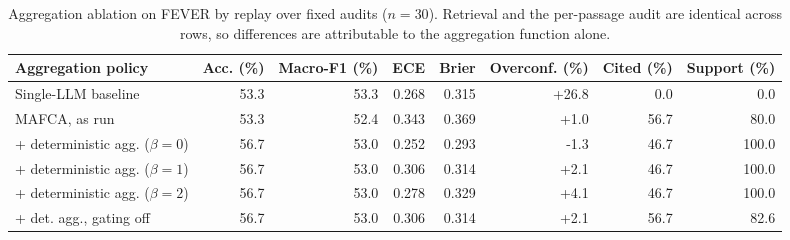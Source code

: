 
\begin{table}[H]
\centering
\caption{Aggregation ablation on FEVER by replay over fixed audits ($n = 30$). Retrieval and the per-passage audit are identical across rows, so differences are attributable to the aggregation function alone.}
\label{tab:fev_ablation}
\small
\begin{tabular}{@{}lrrrrrrr@{}}
\toprule
Aggregation policy & Acc. (\%) & Macro-F1 (\%) & ECE & Brier & Overconf. (\%) & Cited (\%) & Support (\%) \\
\midrule
Single-LLM baseline & 53.3 & 53.3 & 0.268 & 0.315 & +26.8 & 0.0 & 0.0 \\
MAFCA, as run & 53.3 & 52.4 & 0.343 & 0.369 & +1.0 & 56.7 & 80.0 \\
\quad + deterministic agg. ($\beta=0$) & 56.7 & 53.0 & 0.252 & 0.293 & -1.3 & 46.7 & 100.0 \\
\quad + deterministic agg. ($\beta=1$) & 56.7 & 53.0 & 0.306 & 0.314 & +2.1 & 46.7 & 100.0 \\
\quad + deterministic agg. ($\beta=2$) & 56.7 & 53.0 & 0.278 & 0.329 & +4.1 & 46.7 & 100.0 \\
\quad + det. agg., gating off & 56.7 & 53.0 & 0.306 & 0.314 & +2.1 & 56.7 & 82.6 \\
\bottomrule
\end{tabular}
\end{table}
